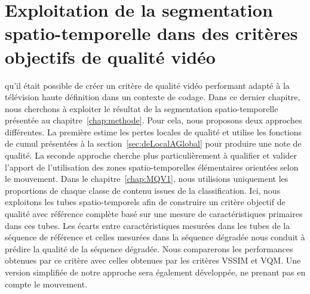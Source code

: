 \chapter{Exploitation de la segmentation spatio-temporelle dans des critères objectifs de qualité vidéo} \label{chap:modeleDistorsionsTubes}
 qu'il était possible de créer un critère de qualité vidéo performant adapté à la télévision haute définition dans un contexte de codage. Dans ce dernier chapitre, nous cherchons à exploiter le résultat de la segmentation spatio-temporelle présentée au chapitre~\ref{chap:methode}. Pour cela, nous proposons deux approches différentes. La première estime les pertes locales de qualité et utilise les fonctions de cumul présentées à la section~\ref{sec:deLocalAGlobal} pour produire une note de qualité. La seconde approche cherche plus particulièrement à qualifier et valider l'apport de l'utilisation des zones spatio-temporelles élémentaires orientées selon le mouvement. Dans le chapitre~\ref{chap:MQV1}, nous utilisions uniquement les proportions de chaque classe de contenu issues de la classification. Ici, nous exploitons les tubes spatio-temporels afin de construire un critère objectif de qualité avec référence complète basé sur une mesure de caractéristiques primaires dans ces tubes. Les écarts entre caractéristiques mesurées dans les tubes de la séquence de référence et celles mesurées dans la séquence dégradée nous conduit à prédire la qualité de la séquence dégradée. Nous comparerons les performances obtenues par ce critère avec celles obtenues par les critères VSSIM et VQM. Une version simplifiée de notre approche sera également développée, ne prenant pas en compte le mouvement.



